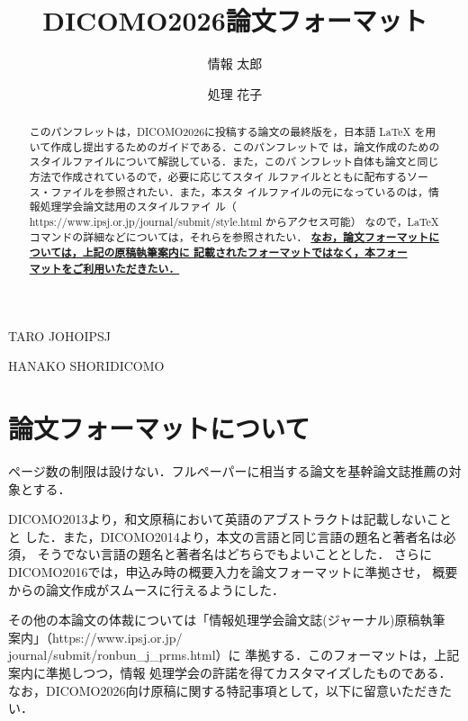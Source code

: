 \documentclass[Japanese]{dicomopapers}
\begin{document}
\title{DICOMO2026論文フォーマット}


\author{情報 太郎}{TARO JOHO}{IPSJ}
\author{処理 花子}{HANAKO SHORI}{DICOMO}

\begin{abstract}
  このパンフレットは，DICOMO2026に投稿する論文の最終版を，日本語
  {\LaTeX} を用いて作成し提出するためのガイドである．このパンフレットで
  は，論文作成のためのスタイルファイルについて解説している．また，このパ
  ンフレット自体も論文と同じ方法で作成されているので，必要に応じてスタイ
  ルファイルとともに配布するソース・ファイルを参照されたい．また，本スタ
  イルファイルの元になっているのは，情報処理学会論文誌用のスタイルファイ
  ル（ https://www.ipsj.or.jp/journal/submit/style.html からアクセス可能）
  なので，{\LaTeX}コマンドの詳細などについては，それらを参照されたい．
  \underline{\bf なお，論文フォーマットについては，上記の原稿執筆案内に
    記載されたフォーマットではなく，本フォー}\\
  \underline{\bf マットをご利用いただきたい．}

\end{abstract}

\maketitle

\section{論文フォーマットについて}
ページ数の制限は設けない．フルペーパーに相当する論文を基幹論文誌推薦の対象とする．

DICOMO2013より，和文原稿において英語のアブストラクトは記載しないことと
した．また，DICOMO2014より，本文の言語と同じ言語の題名と著者名は必須，
そうでない言語の題名と著者名はどちらでもよいこととした．
さらにDICOMO2016では，申込み時の概要入力を論文フォーマットに準拠させ，
概要からの論文作成がスムースに行えるようにした．

その他の本論文の体裁については「情報処理学会論文誌(ジャーナル)原稿執筆
案内」（https://www.ipsj.or.jp/\\journal/submit/ronbun\_j\_prms.html）に
準拠する\cite{webpage}．このフォーマットは，上記案内に準拠しつつ，情報
処理学会の許諾を得てカスタマイズしたものである．
なお，DICOMO2026向け原稿に関する特記事項として，以下に留意いただきたい．
\end{document}
